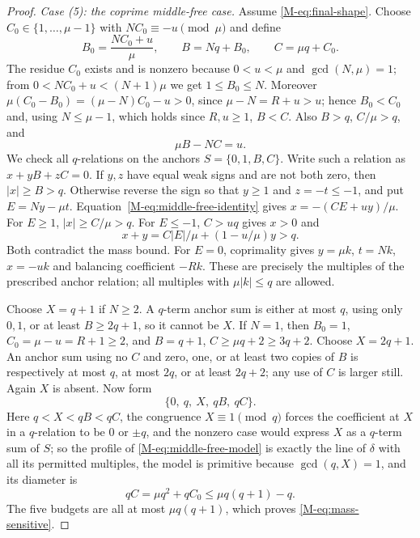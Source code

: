 \documentclass[11pt,reqno]{amsart}
\theoremstyle{plain}
\theoremstyle{definition}
\theoremstyle{plain}
\theoremstyle{plain}
\theoremstyle{plain}
\theoremstyle{plain}
\theoremstyle{plain}
\theoremstyle{plain}
\theoremstyle{definition}
\theoremstyle{definition}
\theoremstyle{definition}
\theoremstyle{plain}
\begin{document}
\begin{proof}
\smallskip\noindent\emph{Case (5): the coprime middle-free case.}
Assume \eqref{M-eq:final-shape}. Choose $C_0\in\{1,\ldots,\mu-1\}$ with
$NC_0\equiv-u\pmod\mu$ and define
\begin{equation}\label{M-eq:middle-free-anchors}
 B_0=\frac{NC_0+u}{\mu},\qquad B=Nq+B_0,\qquad C=\mu q+C_0 .
\end{equation}
The residue $C_0$ exists and is nonzero because $0<u<\mu$ and
$\gcd(N,\mu)=1$; from $0<NC_0+u<(N+1)\mu$ we get $1\le B_0\le N$. Moreover
$\mu(C_0-B_0)=(\mu-N)C_0-u>0$, since $\mu-N=R+u>u$; hence $B_0<C_0$ and,
using $N\le\mu-1$, which holds since $R,u\ge1$, $B<C$. Also $B>q$,
$C/\mu>q$, and
\begin{equation}\label{M-eq:middle-free-identity}
 \mu B-NC=u .
\end{equation}
We check all $q$-relations on the anchors $S=\{0,1,B,C\}$.
Write such a relation as $x+yB+zC=0$. If $y,z$ have equal weak signs
and are not both zero, then $|x|\ge B>q$. Otherwise reverse the sign
so that $y\ge1$ and $z=-t\le-1$, and put $E=Ny-\mu t$.
Equation~\eqref{M-eq:middle-free-identity} gives $x=-(CE+uy)/\mu$.
For $E\ge1$, $|x|\ge C/\mu>q$. For $E\le-1$, $C>uq$
gives $x>0$ and
\[
 x+y=C|E|/\mu+(1-u/\mu)y>q.
\]
Both contradict the mass bound. For $E=0$, coprimality gives
$y=\mu k$, $t=Nk$, $x=-uk$ and balancing coefficient $-Rk$.
These are precisely the multiples of the prescribed anchor relation;
all multiples with $\mu|k|\le q$ are allowed.

Choose $X=q+1$ if $N\ge2$. A $q$-term anchor sum is either at most
$q$, using only $0,1$, or at least $B\ge2q+1$, so it cannot be $X$.
If $N=1$, then $B_0=1$, $C_0=\mu-u=R+1\ge2$, and
$B=q+1$, $C\ge\mu q+2\ge3q+2$. Choose $X=2q+1$.
An anchor sum using no $C$ and zero, one, or at least two copies of
$B$ is respectively at most $q$, at most $2q$, or at least $2q+2$;
any use of $C$ is larger still. Again $X$ is absent.
Now form
\begin{equation}\label{M-eq:middle-free-model}
 \{0,\ q,\ X,\ qB,\ qC\}.
\end{equation}
Here $q<X<qB<qC$, the congruence $X\equiv1\pmod q$ forces the
coefficient at $X$ in a $q$-relation to be $0$ or $\pm q$, and the nonzero
case would express $X$ as a $q$-term sum of $S$; so the profile of
\eqref{M-eq:middle-free-model} is exactly the line of $\delta$ with all its
permitted multiples, the model is primitive because $\gcd(q,X)=1$, and its
diameter is
\begin{equation}\label{M-eq:middle-free-diameter}
 qC=\mu q^2+qC_0\le\mu q(q+1)-q .
\end{equation}
The five budgets are all at most $\mu q(q+1)$, which proves
\eqref{M-eq:mass-sensitive}.
\end{proof}
\end{document}

